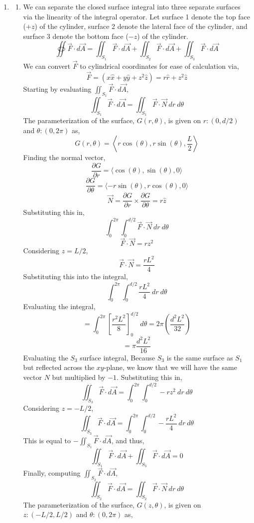 \documentclass[12pt]{article}
\begin{document}
\begin{enumerate}
	\item [1.3]
	\begin{enumerate}
		\item [a.]	
		We can separate the closed surface integral into three separate surfaces via the linearity of the integral operator.
		Let surface 1 denote the top face ($+z$) of the cylinder, surface 2 denote the lateral face of the cylinder, and surface 3 denote the bottom face ($-z$) of the cylinder.
		\[\oiint \vec F \cdot d\vec A = \iint_{S_1}\vec F \cdot d\vec A + \iint_{S_2} \vec F \cdot d\vec A + \iint_{S_3} \vec F \cdot d\vec A\]
		We can convert $\vec F$ to cylindrical coordinates for ease of calculation via,
		\[\vec F = (x\hat x + y\hat y + z^2\hat z)=r\hat r + z^2\hat z\]
		Starting by evaluating $\iint_{S_1}\vec F \cdot d\vec A$, 
		\[\iint_{S_1}\vec F \cdot d\vec A = \iint_{S_1}\vec F \cdot \vec N \: dr \: d\theta\]
		The parameterization of the surface, $G(r,\theta)$, is given on $r:(0,d/2)$ and $\theta:(0,2\pi)$ as,
		\[G(r,\theta)=\left\langle r\cos(\theta), r\sin(\theta), \frac{L}{2}\right\rangle\]
		Finding the normal vector,
		\[\frac{\partial G}{\partial r}=\langle \cos(\theta),\sin(\theta), 0\rangle\]
		\[\frac{\partial G}{\partial \theta}=\langle -r\sin(\theta),r \cos(\theta),0 \rangle\]
		\[\vec N = \frac{\partial G}{\partial r}\times \frac{\partial G}{\partial \theta}=r\hat z\]
		Substituting this in,
		\[\int_0^{2\pi}\int_0^{d/2}\vec F \cdot \vec N \: dr \: d\theta\]
		\[\vec F \cdot \vec N = rz^2\]
		Considering $z=L/2$,
		\[\vec F \cdot \vec N = \frac{rL^2}{4}\]
		Substituting this into the integral,
		\[\int_0^{2\pi}\int_0^{d/2}\frac{rL^2}{4}\:dr\:d\theta\]
		Evaluating the integral,
		\[=\int_0^{2\pi}\left[\frac{r^2L^2}{8}\right]_0^{d/2}\:d\theta=2\pi\left(\frac{d^2L^2}{32}\right)\]
		\[=\pi \frac{d^2L^2}{16}\]
		Evaluating the $S_3$ surface integral,
		Because $S_3$ is the same surface as $S_1$ but reflected across the $xy$-plane, we know that we will have the same vector $N$ but multiplied by $-1$.
		Substituting this in,
		\[\iint_{S_3}\vec F\cdot d\vec A=\int_0^{2\pi}\int_0^{d/2}-rz^2\:dr\:d\theta\]
		Considering $z=-L/2$,
		\[\iint_{S_3}\vec F\cdot d\vec A=\int_0^{2\pi}\int_0^{d/2}-\frac{rL^2}{4}\:dr\:d\theta\]
		This is equal to $-\iint_{S_1}\vec F \cdot d\vec A$, and thus,
		\[\iint_{S_1}\vec F \cdot d\vec A + \iint_{S_3}\vec F \cdot d\vec A = 0\]
		Finally, computing $\iint_{S_2}\vec F \cdot d\vec A$,
		\[\iint_{S_2}\vec F \cdot d\vec A = \iint_{S_2}\vec F \cdot \vec N \: dr\:d\theta\]
		The parameterization of the surface, $G(z,\theta)$, is given on $z:(-L/2,L/2)$ and $\theta:(0,2\pi)$ as,

\end{enumerate}
\end{enumerate}
\end{document}
